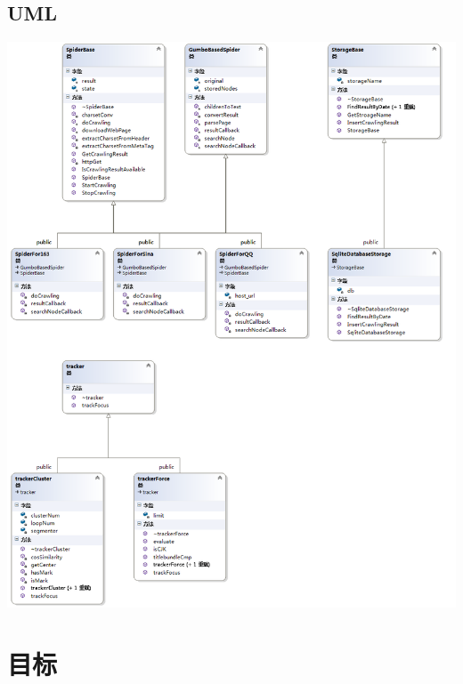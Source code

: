 \documentclass[12pt]{article}
\begin{document}
\subsection{UML}
\begin{center}
\includegraphics[width=\textwidth]{midUML.png}
\end{center}
\section{目标}
\end{document}
